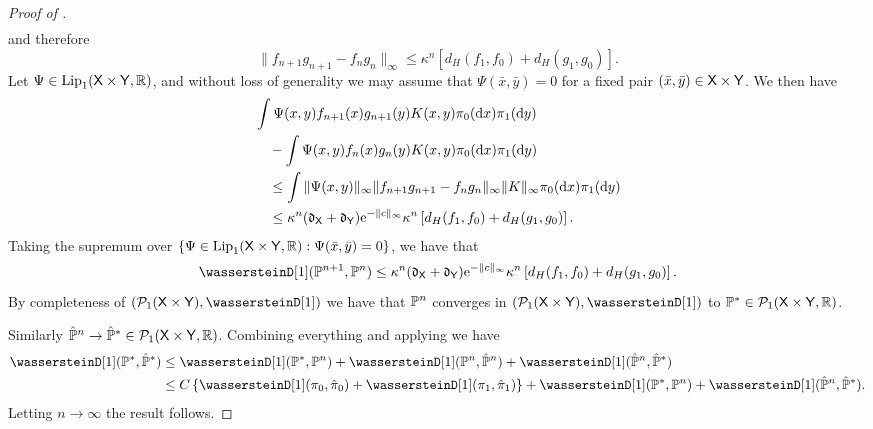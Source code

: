 \documentclass[11pt,a4paper]{article}
\providecommand{\DIFaddtex}[1]{{\protect\color{blue}\uwave{#1}}} %
\providecommand{\DIFdeltex}[1]{{\protect\color{red}\sout{#1}}}                      %
\providecommand{\DIFaddbegin}{} %
\providecommand{\DIFaddend}{} %
\providecommand{\DIFdelbegin}{} %
\providecommand{\DIFdelend}{} %
\providecommand{\DIFadd}[1]{\texorpdfstring{\DIFaddtex{#1}}{#1}} %
\providecommand{\DIFdel}[1]{\texorpdfstring{\DIFdeltex{#1}}{}} %
\begin{document}
\begin{proof}[Proof of ]
\begin{align}
\end{align}
and therefore 
$$\|f_{n+1}g_{n+1}-f_n g_n\|_\infty \leq \kappa^n \left[ d_H(f_1, f_0)+ d_H(g_1, g_0)\right].$$
Let $\Psi \in \operatorname{Lip}_1(\mathsf{X}\times \mathsf{Y}, \mathbb{R})$, 
and without loss of generality we may assume that $\Psi(\bar x, \bar y)=0$ for a fixed pair $(\bar x, \bar y)\in \mathsf{X}\times \mathsf{Y}$. 
We then have 
\begin{align}
&\int \Psi(x,y) f_{n+1}(x) g_{n+1}(y) K(x,y) \DIFdelbegin %
\DIFdelend \pi_0(\DIFaddbegin \rmd \DIFaddend x) \DIFdelbegin %
\DIFdelend \pi_1(\DIFaddbegin \rmd \DIFaddend y)\\
&\quad -   \int \Psi(x,y) f_{n}(x) g_{n}(y) K(x,y) \DIFdelbegin %
\DIFdelend \pi_0(\DIFaddbegin \rmd \DIFaddend x) \DIFdelbegin %
\DIFdelend \pi_1(\DIFaddbegin \rmd \DIFaddend y)\\
&\quad \leq \int \|\Psi(x,y)\|_\infty \|f_{n+1} g_{n+1} - f_n g_n\|_\infty \|K\|_\infty \DIFdelbegin %
\DIFdelend \pi_0(\DIFaddbegin \rmd \DIFaddend x) \DIFdelbegin %
\DIFdelend \pi_1(\DIFaddbegin \rmd \DIFaddend y)\\
&\quad \leq \kappa^n(\diam_\msx + \diam_\msy)\rme^{-\|c\|_\infty}\kappa^n \left[ d_H(f_1, f_0)+ d_H(g_1, g_0)\right].
\end{align}
Taking the supremum over $\{\Psi\in \operatorname{Lip}_1(\mathsf{X}\times\mathsf{Y}, \mathbb{R}): \Psi(\bar x, \bar y) =0\}$, we have that 
$$\wassersteinD[1](\Pbb^{n+1}, \Pbb^{n}) \leq \kappa^n(\diam_\msx + \diam_\msy)\rme^{-\|c\|_\infty}\kappa^n \left[ d_H(f_1, f_0)+ d_H(g_1, g_0)\right].$$
By completeness of $(\Pens_1(\msx\times\msy), \wassersteinD[1])$ we have that $\mathbb{P}^n$ converges in \DIFdelbegin \DIFdel{$(\Pens_1(\msx\times\msy), \wassersteinD[1])$ }\DIFdelend \DIFaddbegin \DIFadd{$(\Pens{P}_1(\msx\times\msy), \wassersteinD[1])$ }\DIFaddend to $\mathbb{P}^\ast\in \mathcal{P}_1(\mathsf{X}\times\mathsf{Y}, \mathbb{R})$. 

Similarly $\hat{\mathbb{P}}^n \to \hat{\mathbb{P}}^\ast\in\mathcal{P}_1(\mathsf{X}\times\mathsf{Y}, \mathbb{R})$. Combining everything and applying  we have 
\begin{align}
\wassersteinD[1](\Pbb^\ast, \hat \Pbb^\ast)
   &\leq \wassersteinD[1](\Pbb^\ast, \Pbb^n)
   + \wassersteinD[1](\Pbb^n, \hat\Pbb^n)+ 
   \wassersteinD[1](\hat\Pbb^n, \hat\Pbb^\ast)\\
   &\leq C \defEns{\wassersteinD[1](\pi_0, \hat{\pi}_0) + \wassersteinD[1](\pi_1, \hat{\pi}_1)} + \wassersteinD[1](\Pbb^\ast, \Pbb^n)+\wassersteinD[1](\hat\Pbb^n, \hat\Pbb^\ast).
\end{align}
Letting $n\to \infty$ the result follows. 
\end{proof}



\end{document}
